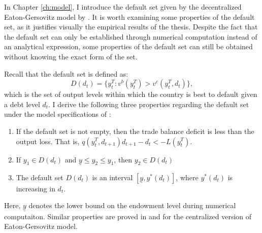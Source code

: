 In Chapter \ref{ch:model}, I introduce the default set given by the decentralized Eaton-Gersovitz model by \citet{Na-18}.
It is worth examining some properties of the default set, as it justifies visually the empirical results of the thesis.
Despite the fact that the default set can only be established through numerical computation instead of an analytical expression, some properties of the default set can still be obtained without knowing the exact form of the set.

\newcommand{\yT}{y^T_{t}}
\newcommand{\yTpr}{y^T_{t+1}}
\newcommand{\dpr}{d_{t+1}}
Recall that the default set is defined as:
\begin{equation*}
    D(d_t) = \{\yT : v^b(\yT) > v^c(\yT, d_t)\},
\end{equation*}
which is the set of output levels within which the country is best to default given a debt level $d_t$.
I derive the following three properties regarding the default set under the model specifications of \citet{Na-18}:
\begin{enumerate}
    \item If the default set is not empty, then the trade balance deficit  is less than the output loss. That is, $q(\yT, \dpr)\dpr - d_t < -L(\yT)$.
    \item If $y_1 \in D(d_t)$ and $\underline{y}\le y_2 \le y_1$, then $y_2 \in D(d_t)$
    \item The default set $D(d_t)$ is an interval $[\underline{y}, y^*(d_t)]$, where $y^*(d_t)$ is increasing in $d_t$.
\end{enumerate}
Here, $\underline{y}$ denotes the lower bound on the endowment level during numerical computaiton.
Similar properties are proved in \citet*{Arellano-08} and \citet*{Uribe-Schmitt-Grohe-textbook} for the centralized version of Eaton-Gersovitz model.

